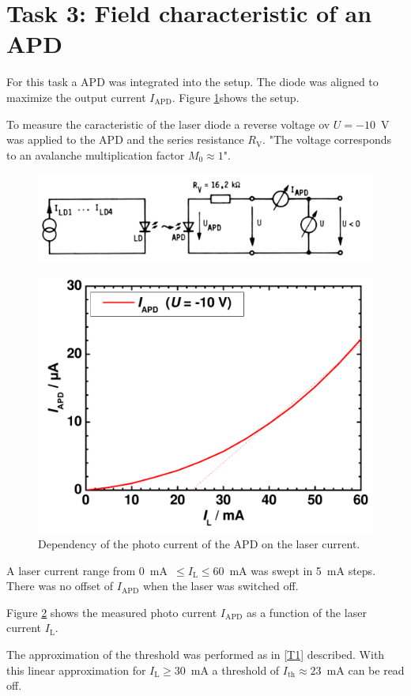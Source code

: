 \section{Task 3: Field characteristic of an APD}

For this task a APD was integrated into the setup. The diode was aligned to maximize the output current $I_{\mathrm{APD}}$.
Figure \ref{fig:T3_setup}\footnotemark[3] shows the setup.

To measure the caracteristic of the laser diode a reverse voltage ov $U = -10$~V was applied to the APD and the series resistance $R_{\mathrm{V}}$. "The voltage corresponds to an avalanche multiplication factor $M_0 \approx 1$"\footnotemark[3].

\begin{figure}%
\centering
\includegraphics[width=.85\columnwidth]{Grafiken/T3_setup.jpg}%
\caption{}%
\label{fig:T3_setup}%
\end{figure}


\begin{figure}%
\centering
\includegraphics[width=.5\columnwidth]{Grafiken/T3_laser.pdf}%
\caption{Dependency of the photo current of the APD on the laser current.}%
\label{fig:T3_laser}%
\end{figure}


A laser current range from 0~mA~$\leq I_{\mathrm{L}} \leq 60$~mA was swept in 5~mA steps. There was no offset of $I_{\mathrm{APD}}$ when the laser was switched off. 

Figure \ref{fig:T3_laser} shows the measured photo current $I_{\mathrm{APD}}$ as a function of the laser current $I_{\mathrm{L}}$. 

The approximation of the threshold was performed as in \ref{T1} described.
With this linear approximation for $I_{\mathrm{L}} \geq 30$~mA a threshold of $I_{\mathrm{th}} \approx 23$~mA can be read off.

